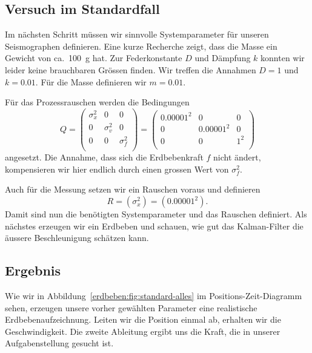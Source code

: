 \subsection{Versuch im Standardfall}
Im nächsten Schritt müssen wir sinnvolle Systemparameter für unseren Seismographen definieren.
Eine kurze Recherche zeigt, dass die Masse ein Gewicht von ca.\ \SI{100}{\gram} hat.
Zur Federkonstante $D$ und Dämpfung $k$ konnten wir leider keine brauchbaren Grössen finden.
Wir treffen die Annahmen $D = 1$ und $k = 0.01$.
Für die Masse definieren wir $m = 0.01$.

Für das Prozessrauschen werden die Bedingungen
\begin{equation}
  Q = 
  \begin{pmatrix}
    \sigma_x ^2 & 0          & 0 \\
    0           & \sigma_v^2 & 0\\
    0           & 0          & \sigma_f^2 \\
  \end{pmatrix}=
  \begin{pmatrix}
    0.00001^2& 0& 0 \\
    0 & 0.00001^2& 0\\
    0 & 0& 1^2 \\
  \end{pmatrix}
\end{equation}
angesetzt.
Die Annahme, dass sich die Erdbebenkraft $f$ nicht ändert,
kompensieren wir hier endlich durch einen grossen Wert von $\sigma_f^2$.

Auch für die Messung setzen wir ein Rauschen voraus und definieren
\begin{equation}
R= (\sigma_x^2)=
(0.00001^2).
\end{equation}
Damit sind nun die benötigten Systemparameter und das Rauschen definiert.
Als nächstes erzeugen wir ein Erdbeben und schauen,
wie gut das Kalman-Filter die äussere Beschleunigung schätzen kann.

\subsection*{Ergebnis}

Wie wir in Abbildung~\ref{erdbeben:fig:standard-alles} im Positions-Zeit-Diagramm sehen, erzeugen unsere vorher gewählten Parameter eine realistische Erdbebenaufzeichnung.
Leiten wir die Position einmal ab, erhalten wir die Geschwindigkeit.
Die zweite Ableitung ergibt uns die Kraft, die in unserer Aufgabenstellung gesucht ist.


